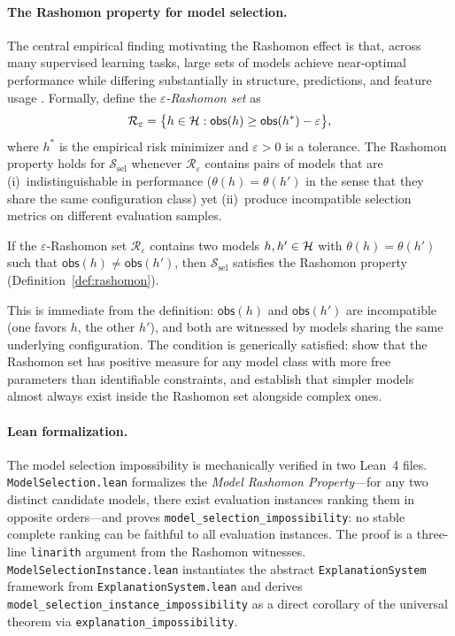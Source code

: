 \paragraph{The Rashomon property for model selection.}
The central empirical finding motivating the Rashomon effect is that, across
many supervised learning tasks, large sets of models achieve near-optimal
performance while differing substantially in structure, predictions, and
feature usage \citep{breiman2001random,fisher2019models,rudin2024amazing}.
Formally, define the \emph{$\varepsilon$-Rashomon set} as
\[
  \mathcal{R}_\varepsilon = \bigl\{ h \in \mathcal{H} : \mathsf{obs}(h) \geq \mathsf{obs}(h^*) - \varepsilon \bigr\},
\]
where $h^*$ is the empirical risk minimizer and $\varepsilon > 0$ is a
tolerance.  The Rashomon property holds for $\mathcal{S}_{\mathrm{sel}}$
whenever $\mathcal{R}_\varepsilon$ contains pairs of models that are
(i)~indistinguishable in performance ($\theta(h) = \theta(h')$ in the sense
that they share the same configuration class) yet
(ii)~produce incompatible selection metrics on different evaluation samples.

\begin{proposition}
\label{prop:ms-rashomon}
If the $\varepsilon$-Rashomon set $\mathcal{R}_\varepsilon$ contains
two models $h, h' \in \mathcal{H}$ with $\theta(h) = \theta(h')$ such that
$\mathsf{obs}(h) \neq \mathsf{obs}(h')$, then $\mathcal{S}_{\mathrm{sel}}$
satisfies the Rashomon property (Definition~\ref{def:rashomon}).
\end{proposition}

\noindent
This is immediate from the definition: $\mathsf{obs}(h)$ and
$\mathsf{obs}(h')$ are incompatible (one favors $h$, the other $h'$), and
both are witnessed by models sharing the same underlying configuration.
The condition is generically satisfied: \citet{fisher2019models} show
that the Rashomon set has positive measure for any model class with more
free parameters than identifiable constraints, and
\citet{semenova2022existence} establish that simpler models almost always
exist inside the Rashomon set alongside complex ones.

\paragraph{Lean formalization.}
The model selection impossibility is mechanically verified in two Lean~4
files.  \texttt{ModelSelection.lean} formalizes the \emph{Model Rashomon
Property}---for any two distinct candidate models, there exist evaluation
instances ranking them in opposite orders---and proves
\texttt{model\_selection\_impossibility}: no stable complete ranking
can be faithful to all evaluation instances.  The proof is a three-line
\texttt{linarith} argument from the Rashomon witnesses.
\texttt{ModelSelectionInstance.lean} instantiates the abstract
\texttt{ExplanationSystem} framework from
\texttt{ExplanationSystem.lean} and derives
\texttt{model\_selection\_instance\_impossibility} as a direct corollary
of the universal theorem via \texttt{explanation\_impossibility}.

